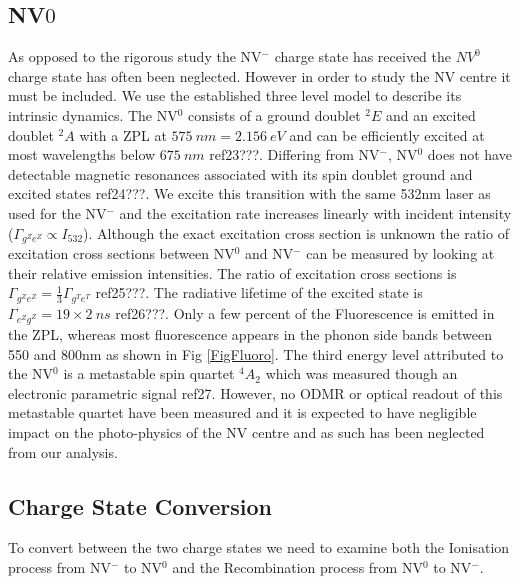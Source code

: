 \documentclass[prl]{revtex4}
\begin{document}
\subsection{NV$0$}

As opposed to the rigorous study the NV$^-$ charge state has received the $NV^0$ charge state has often been neglected. However in order to study the NV centre it must be included. We use the established three level model to describe its intrinsic dynamics. The NV$^0$ consists of a ground doublet $^2E$ and an excited doublet $^2A$ with a ZPL at $\SI{575}{nm} = \SI{2.156}{eV}$  and can be efficiently excited at most wavelengths below $\SI{675}{nm}$ ref23???. Differing from NV$^-$, NV$^0$ does not have detectable magnetic resonances associated with its spin doublet ground and excited states ref24???. We excite this transition with the same 532nm laser as used for the NV$^-$ and the excitation rate increases linearly with incident intensity ($\Gamma_{g^Ze^Z} \propto I_{532}$). Although the exact excitation cross section is unknown the ratio of excitation cross sections between NV$^0$ and NV$^-$ can be measured by looking at their relative emission intensities. The ratio of excitation cross sections is $\Gamma_{g^Ze^Z} = \frac{1}{3} \Gamma_{g^Te^T}$ ref25???. The radiative lifetime of the excited state is $\Gamma_{e^Zg^Z} = 19\times2 \SI{}{ns}$ ref26???.  
 Only a few percent of the Fluorescence is emitted in the ZPL, whereas most fluorescence appears in the phonon side bands between 550 and 800nm as shown in Fig \ref{FigFluoro}. The third energy level attributed to the NV$^0$ is a metastable spin quartet $^4A_2$ which was measured though an electronic parametric signal ref27. However, no ODMR or optical readout of this metastable quartet have been measured and it is expected to have negligible impact on the photo-physics of the NV centre and as such has been neglected from our analysis. 

\subsection{Charge State Conversion}
To convert between the two charge states we need to examine both the Ionisation process from NV$^-$ to NV$^0$ and  the Recombination process from NV$^0$ to NV$^-$.
\end{document}
